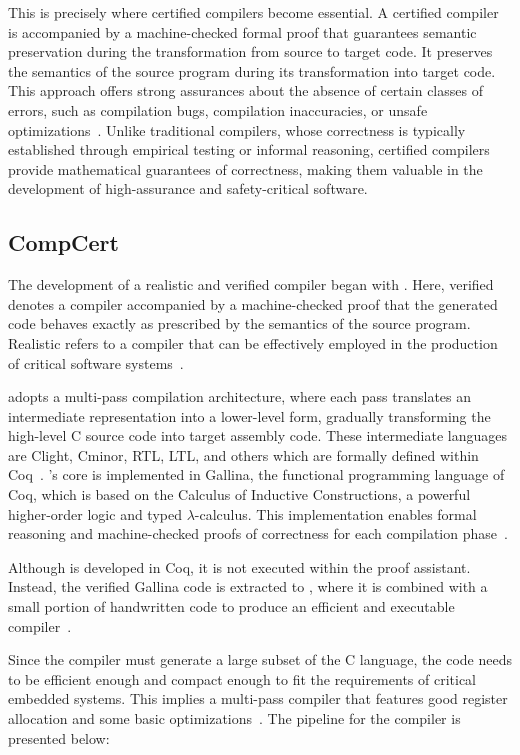 This is precisely where certified compilers become essential. A certified compiler is accompanied by a machine-checked formal proof 
that guarantees semantic preservation during the transformation from source to target code. It preserves the semantics of the source 
program during its transformation into target code. This approach offers strong assurances about the absence of certain classes of 
errors, such as compilation bugs, compilation inaccuracies, or unsafe optimizations~\cite{Leroy09}. Unlike traditional compilers, 
whose correctness is typically established through empirical testing or informal reasoning, certified compilers provide mathematical 
guarantees of correctness, making them valuable in the development of high-assurance and safety-critical software.

\subsection{CompCert}
\label{sec:CompCert}

The development of a realistic and verified compiler began with \compcert. Here, verified denotes a compiler accompanied by
a machine-checked proof that the generated code behaves exactly as prescribed by the semantics of the source program.
Realistic refers to a compiler that can be effectively employed in the production of critical software systems~\cite{Leroy09-back-end}.

\compcert adopts a multi-pass compilation architecture, where each pass translates an intermediate representation into a lower-level 
form, gradually transforming the high-level C source code into target assembly code. These intermediate languages are Clight, Cminor, 
RTL, LTL, and others which are formally defined within Coq~\cite{75277.75285}. \compcert's core is implemented in Gallina, the 
functional programming language of Coq, which is based on the Calculus of Inductive Constructions, a powerful higher-order logic and 
typed $\lambda$-calculus. 
This implementation enables formal reasoning and machine-checked proofs of correctness for each compilation phase~\cite{MonniauxB22}.

Although \compcert is developed in Coq, it is not executed within the proof assistant. Instead, the verified Gallina code is extracted 
to \ocaml, where it is combined with a small portion of handwritten \ocaml code to produce an efficient and executable 
compiler~\cite{MonniauxB22}.

Since the compiler must generate a large subset of the C language, the code needs to be efficient enough and compact enough to fit the 
requirements of critical embedded systems. This implies a multi-pass compiler that features good register allocation and some basic 
optimizations~\cite{Leroy09-back-end}. The pipeline for the compiler is presented below:

